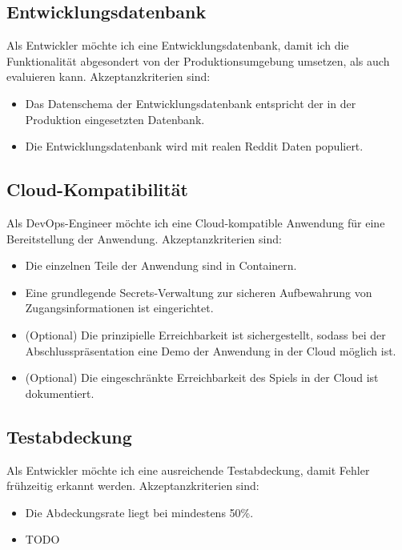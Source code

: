 \documentclass[a4paper, 10pt, conference]{ieeeconf}
\begin{document}
\subsection{Entwicklungsdatenbank}

Als Entwickler möchte ich eine Entwicklungsdatenbank, damit ich die Funktionalität abgesondert von der Produktionsumgebung umsetzen, als auch evaluieren kann.  Akzeptanzkriterien sind:
\begin{itemize}
\item Das Datenschema der Entwicklungsdatenbank entspricht der in der Produktion eingesetzten Datenbank.
\item Die Entwicklungsdatenbank wird mit realen Reddit Daten populiert. 
\end{itemize}

\subsection{Cloud-Kompatibilität}

Als DevOps-Engineer möchte ich eine Cloud-kompatible Anwendung für eine Bereitstellung der Anwendung.  Akzeptanzkriterien sind:
\begin{itemize}
\item Die einzelnen Teile der Anwendung sind in Containern.
\item Eine grundlegende Secrets-Verwaltung zur sicheren Aufbewahrung von Zugangsinformationen ist eingerichtet.
\item (Optional) Die prinzipielle Erreichbarkeit ist sichergestellt,  sodass bei der Abschlusspräsentation eine Demo der Anwendung in der Cloud möglich ist.
\item (Optional) Die eingeschränkte Erreichbarkeit des Spiels in der Cloud ist dokumentiert.
\end{itemize}

\subsection{Testabdeckung}

Als Entwickler möchte ich eine ausreichende Testabdeckung,  damit Fehler frühzeitig erkannt werden.  Akzeptanzkriterien sind:
\begin{itemize}
\item Die Abdeckungsrate liegt bei mindestens 50\%.
\item TODO
\end{itemize}
\end{document}
